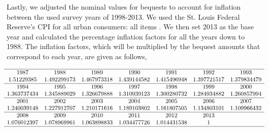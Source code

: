 \documentclass[letterpaper,12pt]{article}
\theoremstyle{definition}
\begin{document}
\begin{spacing}{1.5}
  Lastly, we adjusted the nominal values for bequests to account for inflation between the used survey years of 1998-2013. We used the St. Louis Federal Reserve's CPI for all urban consumers: all items \citet{StFed} . We then set 2013 as the base year and calculated the percentage inflation factors for all the years down to 1988. The inflation factors, which will be multiplied by the bequest amounts that correspond to each year, are given as follows,

  \[
  \begin{matrix}
  \hline
  1987&  1988&  1989&  1990&  1991&  1992&  1993\\

  1.51229385 & 1.492299173& 1.467973318 & 1.439144582 & 1.415496948 & 1.397721517 & 1.379834479 \\
  \hline

   1994&  1995&  1996& 1997&  1998&  1999&  2000\\

  1.363737434 & 1.345889029 & 1.326679888 & 1.310939123 & 1.300280732 & 1.284934882 & 1.260857994  \\
  \hline
   2001&2002&  2003&  2004&  2005&  2006 &2007\\

    1.240039148 & 1.227912707 & 1.210171616 & 1.189103802 & 1.161807505 & 1.134803101& 1.109966432  \\
    \hline

      2008&  2009&  2010&  2011&  2012&  2013\\

    1.076012397 & 1.078969961 & 1.063898833 & 1.034477726 & 1.014431538 & 1\\
  \hline

  \end{matrix}\]


\end{spacing}
\end{document}
